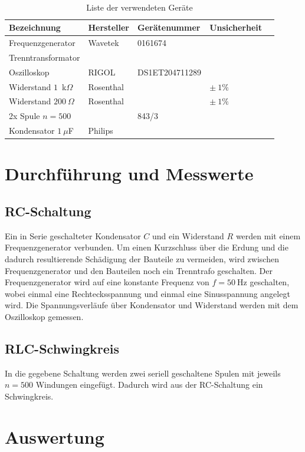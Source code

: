 \documentclass{article}
\begin{document}
\begin{table}[H]
\caption{Liste der verwendeten Geräte}

~

\begin{tabular}{l|llll}
Bezeichnung & Hersteller & Gerätenummer & Unsicherheit \\
\hline
Frequenzgenerator & Wavetek & 0161674  \\
Trenntransformator & \\
Oszilloskop & RIGOL &DS1ET204711289 \\
Widerstand $1$~k$\Omega$ & Rosenthal & & $\pm~1\%$ \\
Widerstand $200~\Omega$ & Rosenthal & & $\pm~1\%$ \\
2x Spule $n=500$ & & 843/3 \\
Kondensator $1~\mu$F & Philips
\end{tabular}

\end{table}




\section{Durchführung und Messwerte}

\subsection{RC-Schaltung}

Ein in Serie geschalteter Kondensator $C$ und ein Widerstand $R$ werden mit einem Frequenzgenerator verbunden. Um einen Kurzschluss über die Erdung und die dadurch resultierende Schädigung der Bauteile zu vermeiden, wird zwischen Frequenzgenerator und den Bauteilen noch ein Trenntrafo geschalten. Der Frequenzgenerator wird auf eine konstante Frequenz von $f=50~$Hz geschalten, wobei einmal eine Rechtecksspannung und einmal eine Sinusspannung angelegt wird. Die Spannungsverläufe über Kondensator und Widerstand werden mit dem Oszilloskop gemessen.


\subsection{RLC-Schwingkreis}

In die gegebene Schaltung werden zwei seriell geschaltene Spulen mit jeweils $n=500$ Windungen eingefügt. Dadurch wird aus der RC-Schaltung ein Schwingkreis.

\section{Auswertung}
\end{document}
